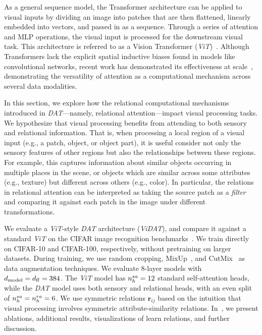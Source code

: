 As a general sequence model, the Transformer architecture can be applied to visual inputs by dividing an image into patches that are then flattened, linearly embedded into vectors, and passed in as a sequence. Through a series of attention and MLP operations, the visual input is processed for the downstream visual task. This architecture is referred to as a Vision Transformer (\textit{ViT})~\citep{dosovitskiyImageWorth16x162020}. Although Transformers lack the explicit spatial inductive biases found in models like convolutional networks, recent work has demonstrated its effectiveness at scale~\citep{zhai2022scaling}, demonstrating the versatility of attention as a computational mechanism across several data modalities.

In this section, we explore how the relational computational mechanisms introduced in \textit{DAT}---namely, relational attention---impact visual processing tasks. We hypothesize that visual processing benefits from attending to both sensory and relational information. That is, when processing a local region of a visual input (e.g., a patch, object, or object part), it is useful consider not only the sensory features of other regions but also the relationships between these regions. For example, this captures information about similar objects occurring in multiple places in the scene, or objects which are similar across some attributes (e.g., texture) but different across others (e.g., color). In particular, the relations in relational attention can be interpreted as taking the source patch as a \textit{filter} and comparing it against each patch in the image under different transformations.

We evaluate a \textit{ViT}-style \textit{DAT} architecture (\textit{ViDAT}), and compare it against a standard \textit{ViT} on the CIFAR image recognition benchmarks~\citep{cifar_dataset}. We train directly on CIFAR-10 and CIFAR-100, respectively, without pretraining on larger datasets. During training, we use random cropping, MixUp~\citep{zhang2018mixup}, and CutMix~\citep{yun2019cutmix} as data augmentation techniques. We evaluate 8-layer models with $d_{\mathrm{model}} = d_{\mathrm{ff}} = 384$. The \textit{ViT} model has $n_h^{sa} = 12$ standard self-attention heads, while the \textit{DAT} model uses both sensory and relational heads, with an even split of $n_h^{sa} = n_h^{ra} = 6$. We use symmetric relations $\bm{r}_{ij}$ based on the intuition that visual processing involves symmetric attribute-similarity relations. 
In~, we present ablations, additional results, visualizations of learn relations, and further discussion.

